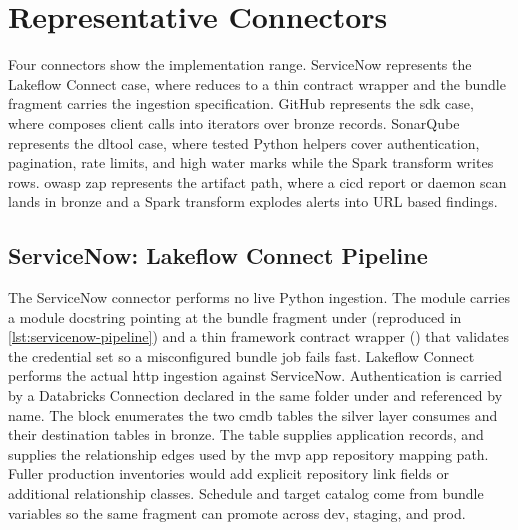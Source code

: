 \section{Representative Connectors}
\label{sec:impl-representative-connectors}

Four connectors show the implementation range. ServiceNow represents the Lakeflow Connect case, where  reduces to a thin contract wrapper and the bundle fragment carries the ingestion specification. GitHub represents the \gls{sdk} case, where  composes client calls into iterators over bronze records. SonarQube represents the \gls{dltool} case, where tested Python helpers cover authentication, pagination, rate limits, and high water marks while the Spark transform writes  rows. \Gls{owasp} \gls{zap} represents the artifact path, where a \gls{cicd} report or daemon scan lands in bronze and a Spark transform explodes alerts into URL based findings.

\subsection{ServiceNow: Lakeflow Connect Pipeline}
\label{sec:impl-servicenow-connector}

The ServiceNow connector performs no live Python ingestion. The  module carries a module docstring pointing at the bundle fragment under \allowbreak{} (reproduced in \autoref{lst:servicenow-pipeline}) and a thin framework contract wrapper () that validates the credential set so a misconfigured bundle job fails fast. Lakeflow Connect performs the actual \gls{http} ingestion against ServiceNow. Authentication is carried by a Databricks Connection declared in the same folder under  and referenced by name. The  block enumerates the two \gls{cmdb} tables the silver layer consumes and their destination tables in bronze. The  table supplies application records, and  supplies the relationship edges used by the \gls{mvp} app repository mapping path. Fuller production inventories would add explicit repository link fields or additional relationship classes. Schedule and target catalog come from bundle variables so the same fragment can promote across dev, staging, and prod.

